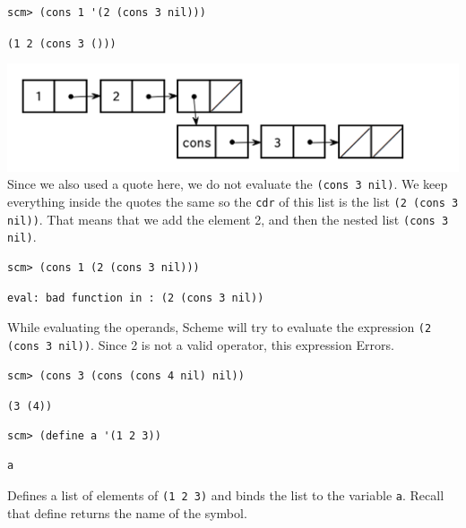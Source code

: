 \begin{lstlisting}
scm> (cons 1 '(2 (cons 3 nil)))
\end{lstlisting}
\begin{solution}[0.25in]
\texttt{(1 2 (cons 3 ()))}
\begin{center}
\includegraphics[scale=0.7]{scheme_lists_5}
Since we also used a quote here, we do not evaluate the \texttt{(cons 3 nil)}. We keep everything inside the quotes the same so the \texttt{cdr} of this list is the list \texttt{(2 (cons 3 nil))}. That means that we add the element 2, and then the nested list \texttt{(cons 3 nil)}.
\end{center}
\end{solution}

\begin{lstlisting}
scm> (cons 1 (2 (cons 3 nil)))
\end{lstlisting}
\begin{solution}[.25in]
\begin{lstlisting}
eval: bad function in : (2 (cons 3 nil))
\end{lstlisting}
While evaluating the operands, Scheme will try to evaluate the expression \texttt{(2 (cons 3 nil))}. Since 2 is not a valid operator, this expression Errors.
\end{solution}

\begin{lstlisting}
scm> (cons 3 (cons (cons 4 nil) nil))
\end{lstlisting}

\begin{solution}[.5in]
\lstinline$(3 (4))$
\end{solution}

\begin{lstlisting}
scm> (define a '(1 2 3))
\end{lstlisting}
\begin{solution}[.25in]
\begin{lstlisting}
a
\end{lstlisting}
Defines a list of elements of \texttt{(1 2 3)} and binds the list to the variable \texttt{a}. Recall that define returns the name of the symbol.
\end{solution}

